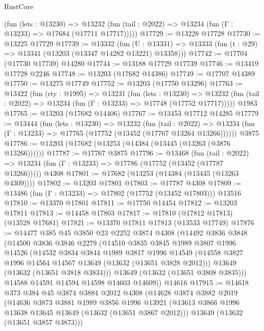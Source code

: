 \begin{lexlean}{RustCore}
\begin{coremodule}
      (fun (lets : @13230) =>
      @13232 (fun (tail : @2022) => @13234 (fun (Γ : @13233) => @17684 (@17711 @17717)))))
@17729 := @13228 @17728
@17730 := @13225 @17729
@17739 := @13332
    (fun (U : @13331) => @13333 (fun (t : @29) => @13341 (@13203 (@13347 @14282 @13221) @13358)))
@17742 := @17704 (@17730 @17739) @14280
@17744 := @13188 @17729 @17739
@17746 := @13419 @17728 @2246
@17748 := @13203 (@17682 @14386)
@17749 := @17707 @14389
@17750 := @13275 @17749
@17752 := @13203 (@17750 @13296)
@17763 := @13422
    (fun (rty : @1995) =>
    @13231
      (fun (lets : @13230) =>
      @13232 (fun (tail : @2022) => @13234 (fun (Γ : @13233) => @17748 (@17752 @17717)))))
    @1983
@17765 := @13203 (@17682 @14406)
@17767 := @13453 @17712 @14285
@17779 := @13444
    (fun (lets : @13230) =>
    @13232
      (fun (tail : @2022) =>
      @13234 (fun (Γ : @13233) => @17765 (@17752 (@13452 (@17767 @13264 @13266))))))
    @3875
@17786 := @13203 (@17682 (@13253 (@14384 (@13445 (@13263 (@3876 @13266))))))
@17787 := @17767 @3875
@17796 := @13468
    (fun (tail : @2022) => @13234 (fun (Γ : @13233) => @17786 (@17752 (@13452 (@17787 @13266)))))
    @4308
@17801 := @17682 (@13253 (@14384 (@13445 (@13263 @4309))))
@17802 := @13203 @17801
@17803 := @17787 @4308
@17809 := @13486 (fun (Γ : @13233) => @17802 (@17752 (@13452 @17803))) @13516
@17810 := @13370 @17801
@17811 := @17750 @14454
@17812 := @13203 @17811
@17813 := @14458 @17803
@17817 := @17810 (@17812 @17813) (@13528 @17681)
@17821 := @13370 @17811 @17813 (@13533 @17749)
@17876 := @14477
    @385
    @45
    @3850
    @23
    @2252
    @3874
    @4308
    (@14492
      @3836
      @3848
      (@14500
        @3836
        @3846
        @2279
        (@14510
          @3835
          @3845
          @1989
          @3807
          @1996
          @14526
          (@14532
            @3834
            @3844
            @1989
            @3817
            @1996
            @14549
            (@14558 @3827 @1996 @14564 @14567 @13649 (@13632 (@13651 @3828 @2012)))
            @13649
            (@13632 (@13651 @3818 @3834)))
          @13649
          (@13632 (@13651 @3808 @3835)))
        @14588
        @14591
        @14594
        @14598
        @14603
        @14609))
    @14616
@17915 := @14618
    @373
    @384
    @45
    @3874
    @3884
    @2012
    @4308
    (@14628
      @3874
      @3882
      @2019
      (@14636
        @3873
        @3881
        @1989
        @3856
        @1996
        @13921
        (@13613 @3866 @1996 @13638 @13645 @13649 (@13632 (@13651 @3867 @2012)))
        @13649
        (@13632 (@13651 @3857 @3873)))

\end{coremodule}
\end{lexlean}
